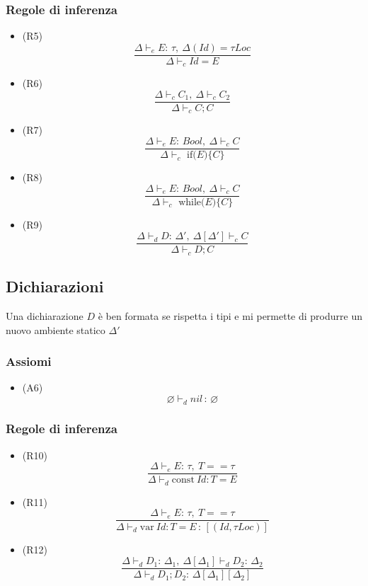 \documentclass{article}
\begin{document}
\subsubsection*{Regole di inferenza}
\begin{itemize}
  \item (R5)
        \[\frac
          {\Delta \vdash_e E:\, \tau,\ \Delta(Id) = \tau Loc}
          {\Delta \vdash_c Id = E}\]

  \item (R6)
        \[\frac
          {\Delta \vdash_c C_1,\ \Delta \vdash_c C_2}
          {\Delta \vdash_c C;C}\]

  \item (R7)
        \[\frac
          {\Delta \vdash_e E:\, Bool,\ \Delta \vdash_c C}
          {\Delta \vdash_c \text{ if($E$)\{$C$\}}}\]

  \item (R8)
        \[\frac
          {\Delta \vdash_e E:\, Bool,\ \Delta \vdash_c C}
          {\Delta \vdash_c \text{ while($E$)\{$C$\}}}\]

  \item (R9)
        \[\frac
          {\Delta \vdash_d D:\, \Delta',\ \Delta[\Delta'] \vdash_c C}
          {\Delta \vdash_c D;C}\]
\end{itemize}
\subsection*{Dichiarazioni}
Una dichiarazione \(D\) è ben formata se rispetta i tipi e mi permette di produrre un nuovo ambiente statico \(\Delta'\)
\subsubsection*{Assiomi}
\begin{itemize}
  \item (A6) \[\varnothing \vdash_d nil \,:\, \varnothing\]
\end{itemize}
\subsubsection*{Regole di inferenza}
\begin{itemize}
  \item (R10)
        \[\frac
          {\Delta \vdash_e E:\, \tau,\ T == \tau}
          {\Delta \vdash_d \text{const}\ Id:T = E}\]

  \item (R11)
        \[\frac
          {\Delta \vdash_e E:\, \tau,\ T == \tau}
          {\Delta \vdash_d \text{var}\ Id:T = E \,:\, [(Id, \tau Loc)]}\]

  \item (R12)
        \[\frac
          {\Delta \vdash_d D_1:\, \Delta_1,\ \Delta[\Delta_1] \vdash_d D_2:\, \Delta_2}
          {\Delta \vdash_d D_1;D_2:\, \Delta[\Delta_1][\Delta_2]}\]
\end{itemize}
\end{document}
